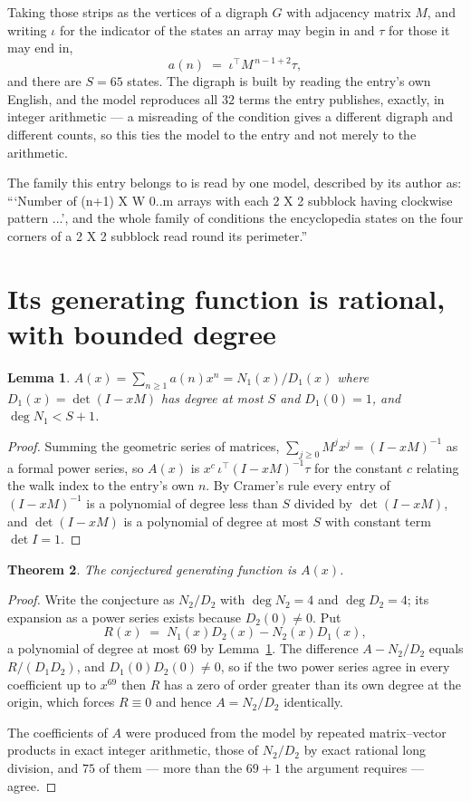 \documentclass[11pt,a4paper]{article}
\theoremstyle{plain}
\newtheorem{theorem}{Theorem}
\newtheorem{lemma}[theorem]{Lemma}
\theoremstyle{definition}
\begin{document}
Taking those strips as the vertices of a digraph $G$ with adjacency matrix $M$, and writing
$\iota$ for the indicator of the states an array may begin in and $\tau$ for those it may end
in,
\[
a(n)\;=\;\iota^{\!\top}M^{\,n-1+2}\tau ,
\]
and there are $S=65$ states. The digraph is built by reading the entry's own English, and the
model reproduces all $32$ terms the entry publishes, exactly, in integer arithmetic --- a
misreading of the condition gives a different digraph and different counts, so this ties the
model to the entry and not merely to the arithmetic.

The family this entry belongs to is read by one model, described by its author as: ```Number of (n+1) X W 0..m arrays with each 2 X 2 subblock having clockwise pattern ...', and the whole family of conditions the encyclopedia states on the four corners of a 2 X 2 subblock read round its perimeter.''


\section{Its generating function is rational, with bounded degree}

\begin{lemma}\label{lem:rat}
$A(x)=\sum_{n\ge1}a(n)x^n=N_1(x)/D_1(x)$ where $D_1(x)=\det(I-xM)$ has degree at most
$S$ and $D_1(0)=1$, and $\deg N_1<S+1$.
\end{lemma}

\begin{proof}
Summing the geometric series of matrices, $\sum_{j\ge0}M^jx^j=(I-xM)^{-1}$ as a formal
power series, so $A(x)$ is $x^{c}\,\iota^{\!\top}(I-xM)^{-1}\tau$ for the constant $c$
relating the walk index to the entry's own $n$. By Cramer's rule every entry of
$(I-xM)^{-1}$ is a polynomial of degree less than $S$ divided by $\det(I-xM)$, and
$\det(I-xM)$ is a polynomial of degree at most $S$ with constant term $\det I=1$.
\end{proof}

\begin{theorem}
The conjectured generating function is $A(x)$.
\end{theorem}

\begin{proof}
Write the conjecture as $N_2/D_2$ with $\deg N_2=4$ and $\deg D_2=4$; its expansion as a
power series exists because $D_2(0)\neq0$. Put
\[
R(x)\;=\;N_1(x)D_2(x)-N_2(x)D_1(x),
\]
a polynomial of degree at most $69$ by Lemma~\ref{lem:rat}. The difference
$A-N_2/D_2$ equals $R/(D_1D_2)$, and $D_1(0)D_2(0)\neq0$, so if the two power series agree in
every coefficient up to $x^{69}$ then $R$ has a zero of order greater than its own
degree at the origin, which forces $R\equiv0$ and hence $A=N_2/D_2$ identically.

The coefficients of $A$ were produced from the model by repeated matrix--vector products in
exact integer arithmetic, those of $N_2/D_2$ by exact rational long division, and $75$
of them --- more than the $69+1$ the argument requires --- agree.
\end{proof}
\end{document}
